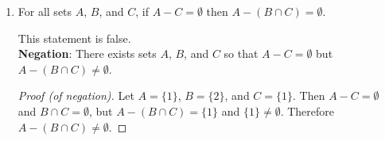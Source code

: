 \documentclass[11pt]{article}
\begin{document}
\begin{enumerate}
\begin{Solution}
\end{Solution}

\item For all sets $A$, $B$, and $C$, if $A-C=\emptyset$ then $A-(B\cap C)=\emptyset$.
\begin{Solution}This statement is false.\\
      \textbf{Negation}: There exists sets $A$, $B$, and $C$ so that $A-C=\emptyset$ but $A-(B\cap C)\neq\emptyset$.
      \begin{proof}[Proof \textup{(}of negation\textup{)}]
       Let $A=\{1\}$, $B=\{2\}$, and $C=\{1\}$. Then $A- C=\emptyset$ and $B\cap C=\emptyset$, but $A-(B\cap C)=\{1\}$ and $\{1\}\neq\emptyset$. Therefore $A-(B\cap C)\neq\emptyset$.
      \end{proof}
\end{Solution}
\end{enumerate}
\end{document}
